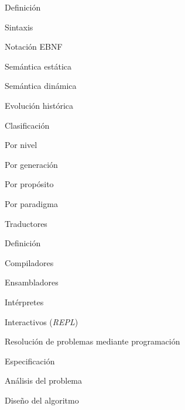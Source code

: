 \begin{longenum}
\begin{longenum}
        \begin{longenum}
            \item Definición
            \begin{longenum}
                \item Sintaxis
                \begin{longenum}
                    \item Notación EBNF
                \end{longenum}
                \item Semántica estática
                \item Semántica dinámica
            \end{longenum}
            \item Evolución histórica 
            \item Clasificación
            \begin{longenum}
                \item Por nivel
                \item Por generación
                \item Por propósito
                \item Por paradigma
            \end{longenum}
        \end{longenum}
        \item Traductores
        \begin{longenum}
            \item Definición
            \item Compiladores
            \begin{longenum}
                \item Ensambladores
            \end{longenum}
            \item Intérpretes
            \begin{longenum}
                \item Interactivos (\textit{REPL})
            \end{longenum}
        \end{longenum}
        \item Resolución de problemas mediante programación
        \begin{longenum}
            \item Especificación
            \item Análisis del problema
            \item Diseño del algoritmo

\end{longenum}
\end{longenum}
\end{longenum}
